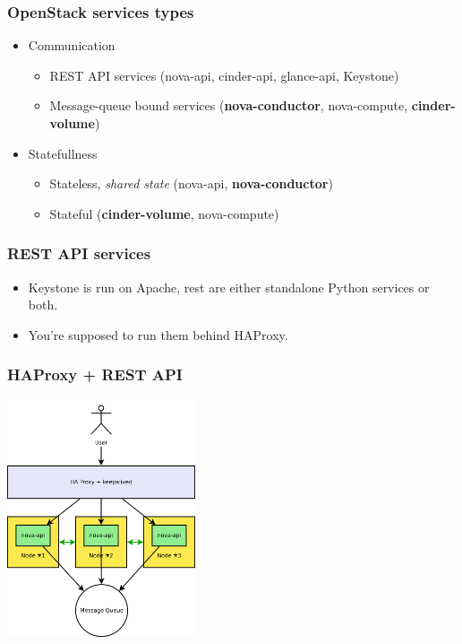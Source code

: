 \documentclass[aspectratio=43]{beamer}
\begin{document}
\begin{frame}
    \frametitle{OpenStack services types}
    \begin{itemize}
        \item Communication
        \begin{itemize}
            \item REST API services (nova-api, cinder-api, glance-api, Keystone)
            \item Message-queue bound services (\textbf{nova-conductor}, nova-compute, \textbf{cinder-volume})
        \end{itemize}
        \pause
        \item Statefullness
        \begin{itemize}
            \item Stateless, \emph{shared state} (nova-api, \textbf{nova-conductor})
            \item Stateful (\textbf{cinder-volume}, nova-compute)
        \end{itemize}
    \end{itemize}
\end{frame}

\begin{frame}
    \frametitle{REST API services}
    \begin{itemize}
        \item Keystone is run on Apache, rest are either standalone Python services or both.
        \item You're supposed to run them behind HAProxy.
    \end{itemize}
\end{frame}

\begin{frame}
    \frametitle{HAProxy + REST API}
    \begin{center}
        \includegraphics[height=7cm]{images/haproxy1.png}
    \end{center}
\end{frame}
\end{document}
